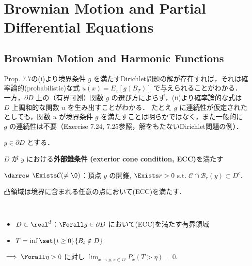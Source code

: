 \documentclass{jsarticle}
\title{}
\author{}
\date{
}
\begin{document}
\setcounter{section}{6}
\section{Brownian Motion and Partial Differential Equations}
\setcounter{subsection}{1}
\subsection{Brownian Motion and Harmonic Functions}

Prop. 7.7の(i)より境界条件 $g$ を満たすDirichlet問題の解が存在すれば，それは確率論的(probabilistic)な式 $u(x)=E_x[g(B_T)]$ で与えられることがわかる．
一方，$\partial D$ 上の（有界可測）関数 $g$ の選び方によらず，(ii)より確率論的な式は $D$ 上調和的な関数 $u$ を生み出すことがわかる．
たとえ $g$ に連続性が仮定されたとしても，関数 $u$ が境界条件 $g$ を満たすことは明らかではなく，また一般的に $g$ の連続性は不要（Exercise 7.24, 7.25参照，解をもたないDirichlet問題の例）．


\begin{df*}
    $y\in\partial D$ とする．
    
    $D$ が $y$ における\textbf{外部錐条件 (exterior cone condition, ECC)}を満たす
    
    $\darrow$
    $\Exists \mathcal{C}(\neq\0)$：頂点 $y$ の開錐, $\Exists r>0$ s.t. $\mathcal{C}\cap \mathcal{B}_r(y)\subset D^c.$
\end{df*}

\begin{ex*}
    凸領域は境界に含まれる任意の点において(ECC)を満たす．
\end{ex*}


\setcounter{thm}{8}
\begin{lem}~
    \begin{itemize}
        \item $D\subset \real^d$：$\Forall y\in\partial D$ において(ECC)を満たす有界領域
        \item $T=\inf\set{t\ge0}{B_t\notin D}$
    \end{itemize}

    $\implies \Forall \eta>0$ に対し $\lim_{x\to y, x\in D}P_x(T>\eta) = 0.$
\end{lem}
\end{document}
